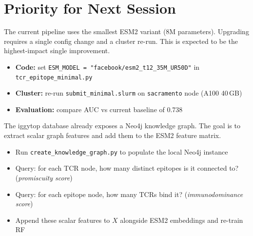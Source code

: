 \documentclass[11pt,a4paper]{article}
\begin{document}
\section{Priority for Next Session}

\begin{tcolorbox}[prioritybox=nextorg, title=Step 4 --- Larger ESM2 Model]
The current pipeline uses the smallest ESM2 variant (8M parameters).
Upgrading requires a single config change and a cluster re-run.
This is expected to be the highest-impact single improvement.

\vspace{4pt}
\begin{itemize}[leftmargin=1.2em, itemsep=2pt]
  \item \textbf{Code:} set \texttt{ESM\_MODEL = "facebook/esm2\_t12\_35M\_UR50D"}
        in \texttt{tcr\_epitope\_minimal.py}
  \item \textbf{Cluster:} re-run \texttt{submit\_minimal.slurm} on
        \texttt{sacramento} node (A100 40\,GB)
  \item \textbf{Evaluation:} compare AUC vs current baseline of 0.738
\end{itemize}
\end{tcolorbox}

\vspace{8pt}

\begin{tcolorbox}[prioritybox=planblue, title=Step 6 --- Knowledge Graph Features]
The iggytop database already exposes a Neo4j knowledge graph.
The goal is to extract scalar graph features and add them to the ESM2 feature matrix.

\vspace{4pt}
\begin{itemize}[leftmargin=1.2em, itemsep=2pt]
  \item Run \texttt{create\_knowledge\_graph.py} to populate the local Neo4j instance
  \item Query: for each TCR node, how many distinct epitopes is it connected to?
        (\emph{promiscuity score})
  \item Query: for each epitope node, how many TCRs bind it?
        (\emph{immunodominance score})
  \item Append these scalar features to $X$ alongside ESM2 embeddings and re-train RF
\end{itemize}
\end{tcolorbox}
\end{document}
